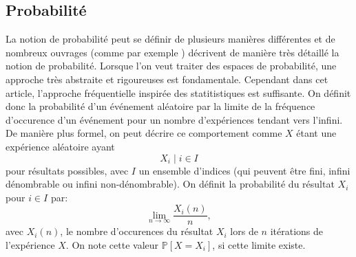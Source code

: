 \documentclass[letterpaper]{article}
\begin{document}
  \subsection{Probabilité}
    \label{probabilite}
    La notion de probabilité peut se définir de plusieurs manières différentes 
    et de nombreux ouvrages (comme par exemple \citep{IP}) décrivent 
    de manière très détaillé la notion de probabilité.  Lorsque l'on veut
    traiter des espaces de probabilité, une approche très abstraite et
    rigoureuses est fondamentale.  Cependant dans cet article, l'approche
    fréquentielle inspirée des statitistiques est suffisante.
    On définit donc la probabilité d'un événement aléatoire par la limite
    de la fréquence d'occurence d'un événement pour un nombre d'expériences
    tendant vers l'infini.  De manière plus formel, on peut décrire ce
    comportement comme $X$ étant une expérience aléatoire ayant
    $$X_i \mid i \in I $$
    pour résultats possibles, avec $I$ un ensemble d'indices (qui peuvent 
    être fini, infini dénombrable ou infini non-dénombrable).  On définit
    la probabilité du résultat $X_i$ pour $i \in I$ par:
    $$\lim_{n \to \infty}\frac {X_i(n)}n,$$
    avec $X_i(n)$, le nombre d'occurences du résultat $X_i$ lors de
    $n$ itérations de l'expérience $X$.  On note cette valeur
    $\mathbb P[X = X_i]$, si cette limite existe.
    
    
\end{document}
